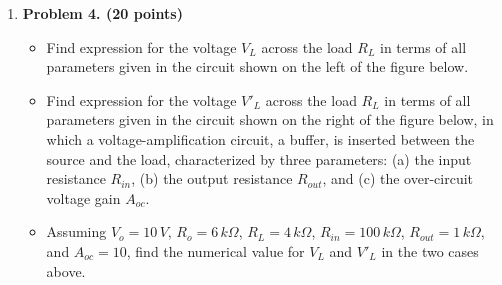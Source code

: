 \begin{enumerate}
\item {\bf Problem 4. (20 points)} 
  \begin{itemize}
  \item Find expression for the voltage $V_L$ across the load $R_L$ in terms 
    of all parameters given in the circuit shown on the left of the figure 
    below.
  \item Find expression for the voltage $V'_L$ across the load $R_L$ in terms 
    of all parameters given in the circuit shown on the right of the figure 
    below, in which a voltage-amplification circuit, a buffer, is inserted 
    between the source and the load, characterized by three parameters: 
    (a) the input resistance $R_{in}$, (b) the output resistance $R_{out}$, 
    and (c) the over-circuit voltage gain $A_{oc}$. 
  \item Assuming $V_o=10\,V$, $R_o=6\,k\Omega$, $R_L=4\,k\Omega$, 
    $R_{in}=100\,k\Omega$, $R_{out}=1\,k\Omega$, and $A_{oc}=10$, find the 
    numerical value for $V_L$ and $V'_L$ in the two cases above.
  \end{itemize}


\end{enumerate}



